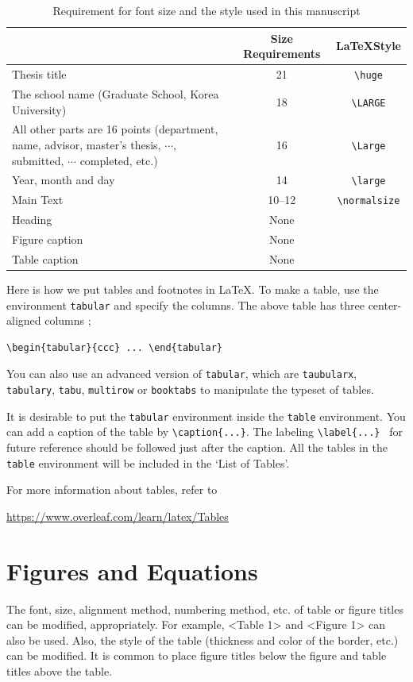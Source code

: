 \documentclass[11pt]{report}
\begin{document}
\begin{table}[h]\centering
\caption{Requirement for font size and the style used in this manuscript}\label{tab:font size}
\bigskip
\begin{tabular}{>{\centering\arraybackslash}p{6cm}cc}
\toprule
&Size Requirements&\LaTeX Style\\\midrule
Thesis title			&21&\verb|\huge|\\\midrule
The school name (Graduate School, Korea University)
					&18&\verb|\LARGE|\\\midrule
All other parts are 16 points (department, name, advisor, master's thesis, \(\cdots\), submitted, \(\cdots\) completed, etc.)	
					&16&\verb|\Large|\\\midrule
Year, month and day	&14&\verb|\large|\\\midrule
Main Text			&10--12&\verb|\normalsize|\\\midrule
Heading				&None&\\\midrule
Figure caption			&None&\\\midrule
Table caption			&None&\\\bottomrule
\end{tabular}
\end{table}

Here is how we put tables and footnotes in \LaTeX.
To make a table, use the environment \texttt{tabular} and specify the columns.
The above table has three center-aligned columns ;
\begin{verbatim}
\begin{tabular}{ccc} ... \end{tabular}
\end{verbatim}
You can also use an advanced version of \texttt{tabular}, which are \texttt{taubularx}, \texttt{tabulary}, \texttt{tabu}, \texttt{multirow} or \texttt{booktabs} to manipulate the typeset of tables.

It is desirable to put the \texttt{tabular} environment inside the \texttt{table} environment.
You can add a caption of the table by \verb|\caption{...}|.
The labeling \verb|\label{...} | for future reference should be followed just after the caption.
All the tables in the \texttt{table} environment will be included in the `List of Tables'.

For more information about tables, refer to \par
\url{https://www.overleaf.com/learn/latex/Tables}

\section{Figures and Equations}\label{sec:figures_and_equations}
The font, size, alignment method, numbering method, etc. of table or figure titles can be modified, appropriately. For example, <Table 1> and <Figure 1> can also be used. Also, the style of the table (thickness and color of the border, etc.) can be modified. It is common to place figure titles below the figure and table titles above the table.
\end{document}
